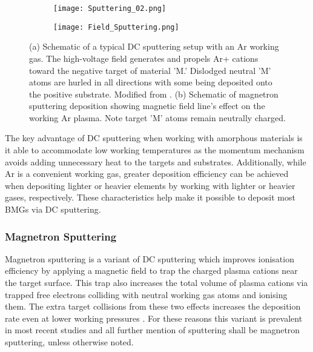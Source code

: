 \documentclass[draft,a4paper,12pt,oneside]{report}%
\begin{document}
\begin{figure}[bp]
	\centering
	\begin{subfigure}[htbp]{0.75\textwidth}
		\texttt{[image: Sputtering\_02.png]}
		\caption{}
		\label{fig:Sputter_Schematic}
	\end{subfigure}
	\begin{subfigure}[htbp]{0.75\textwidth}
		\texttt{[image: Field\_Sputtering.png]}
		\caption{}
		\label{fig:Field_Sputtering}
	\end{subfigure}
	\caption[Sputtering Schematic]{(a) Schematic of a typical DC sputtering setup with an Ar working gas. The high-voltage field generates and propels Ar+ cations toward the negative target of material 'M.' Dislodged neutral 'M' atoms are hurled in all directions with some being deposited onto the positive substrate. Modified from \cite{Brown2014}. (b) Schematic of magnetron sputtering deposition showing magnetic field line's effect on the working Ar plasma. Note target 'M' atoms remain neutrally charged.}%
	\label{fig:Sputter}
\end{figure}

The key advantage of DC sputtering when working with amorphous materials is it able to accommodate low working temperatures as the momentum mechanism avoids adding unnecessary heat to the targets and substrates. Additionally, while Ar is a convenient working gas, greater deposition efficiency can be achieved when depositing lighter or heavier elements by working with lighter or heavier gases, respectively. These characteristics help make it possible to deposit most BMGs via DC sputtering.  

\subsubsection{Magnetron Sputtering}
Magnetron sputtering is a variant of DC sputtering which improves ionisation efficiency by applying a magnetic field to trap the charged plasma cations near the target surface. This trap also increases the total volume of plasma cations via trapped free electrons colliding with neutral working gas atoms and ionising them. The extra target collisions from these two effects increases the deposition rate even at lower working pressures . For these reasons this variant is prevalent in most recent studies and all further mention of sputtering shall be magnetron sputtering, unless otherwise noted. 
\end{document}
